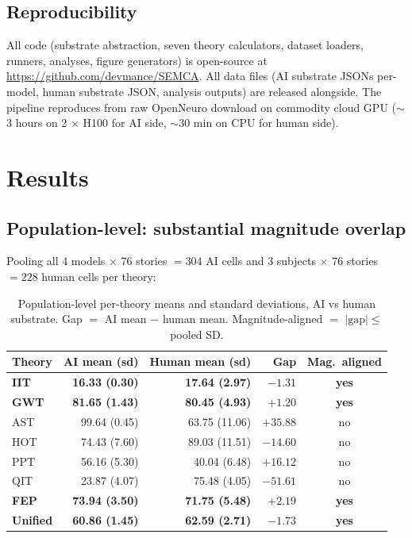 \documentclass[11pt,a4paper]{article}
\begin{document}
\subsection{Reproducibility}

All code (substrate abstraction, seven theory calculators, dataset loaders, runners, analyses, figure generators) is open-source at \url{https://github.com/devmance/SEMCA}. All data files (AI substrate JSONs per-model, human substrate JSON, analysis outputs) are released alongside. The pipeline reproduces from raw OpenNeuro download on commodity cloud GPU ($\sim$3 hours on 2 $\times$ H100 for AI side, $\sim$30 min on CPU for human side).

\section{Results}

\subsection{Population-level: substantial magnitude overlap}
\label{sec:results-population}

Pooling all 4 models $\times$ 76 stories $= 304$ AI cells and 3 subjects $\times$ 76 stories $= 228$ human cells per theory:

\begin{table}[h]
\centering
\small
\begin{tabular}{lrrrc}
\toprule
\textbf{Theory} & \textbf{AI mean (sd)} & \textbf{Human mean (sd)} & \textbf{Gap} & \textbf{Mag.\ aligned} \\
\midrule
\textbf{IIT}    & \textbf{16.33 (0.30)}  & \textbf{17.64 (2.97)}  & \textbf{$-1.31$} & \textbf{yes} \\
\textbf{GWT}    & \textbf{81.65 (1.43)}  & \textbf{80.45 (4.93)}  & \textbf{$+1.20$} & \textbf{yes} \\
AST             & 99.64 (0.45)  & 63.75 (11.06) & $+35.88$ & no \\
HOT             & 74.43 (7.60)  & 89.03 (11.51) & $-14.60$ & no \\
PPT             & 56.16 (5.30)  & 40.04 (6.48)  & $+16.12$ & no \\
QIT             & 23.87 (4.07)  & 75.48 (4.05)  & $-51.61$ & no \\
\textbf{FEP}    & \textbf{73.94 (3.50)}  & \textbf{71.75 (5.48)}  & \textbf{$+2.19$} & \textbf{yes} \\
\textbf{Unified} & \textbf{60.86 (1.45)}  & \textbf{62.59 (2.71)}  & \textbf{$-1.73$} & \textbf{yes} \\
\bottomrule
\end{tabular}
\caption{Population-level per-theory means and standard deviations, AI vs human substrate. Gap $=$ AI mean $-$ human mean. Magnitude-aligned $=$ $|\text{gap}| \leq$ pooled SD.}
\end{table}
\end{document}
